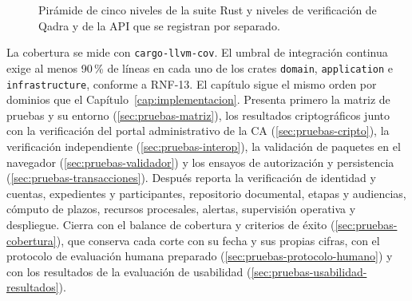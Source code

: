 \begin{figure}[H]
  \centering
  \resizebox{\linewidth}{!}{}
  \caption{Pirámide de cinco niveles de la suite Rust y niveles de verificación de Qadra y de la API que se registran por separado.}
  \label{fig:pruebas-niveles}
\end{figure}

La cobertura se mide con \texttt{cargo-llvm-cov}. El umbral de integración continua exige al menos 90\,\% de líneas en cada uno de los crates \texttt{domain}, \texttt{application} e \texttt{infrastructure}, conforme a RNF-13. El capítulo sigue el mismo orden por dominios que el Capítulo~\ref{cap:implementacion}. Presenta primero la matriz de pruebas y su entorno (\cref{sec:pruebas-matriz}), los resultados criptográficos junto con la verificación del portal administrativo de la CA (\cref{sec:pruebas-cripto}), la verificación independiente (\cref{sec:pruebas-interop}), la validación de paquetes en el navegador (\cref{sec:pruebas-validador}) y los ensayos de autorización y persistencia (\cref{sec:pruebas-transacciones}). Después reporta la verificación de identidad y cuentas, expedientes y participantes, repositorio documental, etapas y audiencias, cómputo de plazos, recursos procesales, alertas, supervisión operativa y despliegue. Cierra con el balance de cobertura y criterios de éxito (\cref{sec:pruebas-cobertura}), que conserva cada corte con su fecha y sus propias cifras, con el protocolo de evaluación humana preparado (\cref{sec:pruebas-protocolo-humano}) y con los resultados de la evaluación de usabilidad (\cref{sec:pruebas-usabilidad-resultados}).































